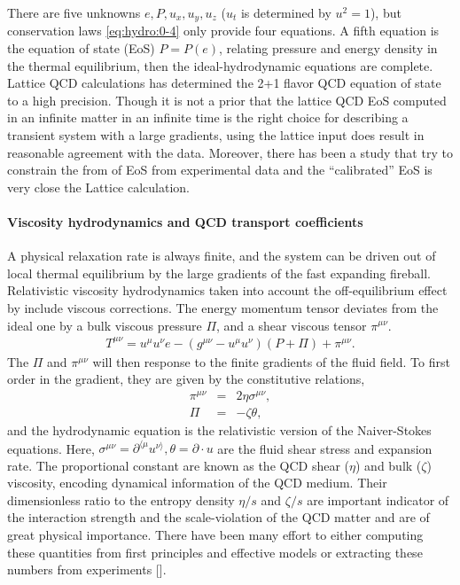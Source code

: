 There are five unknowns $e, P, u_x, u_y, u_z$ ($u_t$ is determined by $u^2 = 1$), but conservation laws \ref{eq:hydro:0-4} only provide four equations.
A fifth equation is the equation of state (EoS) $P = P(e)$, relating pressure and energy density in the thermal equilibrium, then the ideal-hydrodynamic equations are complete.
Lattice QCD calculations has determined the 2+1 flavor QCD equation of state to a high precision.
Though it is not a prior that the lattice QCD EoS computed in an infinite matter in an infinite time is the right choice for describing a transient system with a large gradients, using the lattice input does result in reasonable agreement with the data.
Moreover, there has been a study that try to constrain the from of EoS from experimental data and the ``calibrated'' EoS is very close the Lattice calculation.

\paragraph{Viscosity hydrodynamics and QCD transport coefficients}
A physical relaxation rate is always finite, and the system can be driven out of local thermal equilibrium by the large gradients of the fast expanding fireball.
Relativistic viscosity hydrodynamics taken into account the off-equilibrium effect by include viscous corrections.
The energy momentum tensor deviates from the ideal one by a bulk viscous pressure $\Pi$, and a shear viscous tensor $\pi^{\mu\nu}$.
\begin{eqnarray}
T^{\mu\nu} = u^\mu u^\nu e - (g^{\mu\nu}- u^\mu u^\nu) (P+\Pi) + \pi^{\mu\nu}.
\end{eqnarray}
The $\Pi$ and $\pi^{\mu\nu}$ will then response to the finite gradients of the fluid field.
To first order in the gradient, they are given by the constitutive relations,
\begin{eqnarray}
\pi^{\mu\nu} &=& 2\eta\sigma^{\mu\nu},\\
\Pi &=& -\zeta\theta,
\end{eqnarray}
and the hydrodynamic equation is the relativistic version of the Naiver-Stokes equations.
Here, $\sigma^{\mu\nu} = \partial^{\langle \mu} u^{\nu\rangle}, \theta = \partial\cdot u$ are the fluid shear stress and expansion rate.
The proportional constant are known as the QCD shear ($\eta$) and bulk ($\zeta$) viscosity, encoding dynamical information of the QCD medium. 
Their dimensionless ratio to the entropy density $\eta/s$ and $\zeta/s$ are important indicator of the interaction strength and the scale-violation of the QCD matter and are of great physical importance.
There have been many effort to either computing these quantities from first principles and effective models or extracting these numbers from experiments [].

